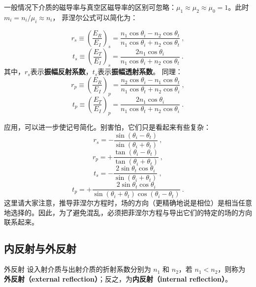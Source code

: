 一般情况下介质的磁导率与真空区磁导率的区别可忽略：$\mu_1\approx\mu_2\approx\mu_0=1$。此时$m_i=n_i/\mu_i \approx n_i$， 菲涅尔公式可以简化为：

\begin{equation}\label{eq_Fresnl_3}
r_s \equiv \left(\frac{E_R}{E_I}\right)_s = \frac{n_1\cos{\theta_i} - n_2\cos\theta_t}{n_1\cos\theta_i + n_2\cos\theta_t}~,
\end{equation}
\begin{equation}\label{eq_Fresnl_4}
t_s \equiv \left(\frac{E_T}{E_I}\right)_s =  \frac{2 n_1\cos\theta_i}{n_1\cos\theta_i + n_2\cos\theta_t}~.
\end{equation}
其中，$r_s$表示\textbf{振幅反射系数}，$t_s$表示\textbf{振幅透射系数}。
同理：
\begin{equation}\label{eq_Fresnl_5}
r_p \equiv \left(\frac{E_R}{E_I}\right)_p = \frac{n_2\cos{\theta_i} - n_1\cos\theta_t}{n_1\cos\theta_t + n_2\cos\theta_i}~,
\end{equation}
\begin{equation}\label{eq_Fresnl_6}
t_p \equiv \left(\frac{E_T}{E_I}\right)_p =  \frac{2 n_1\cos\theta_i}{n_1\cos\theta_t + n_2\cos\theta_i}~.
\end{equation}

应用，可以进一步使记号简化。别害怕，它们只是看起来有些复杂：
\begin{equation}\label{eq_Fresnl_7}
r_s = -\frac{\sin(\theta_i - \theta_t)}{\sin(\theta_i + \theta_t)}~,
\end{equation}
\begin{equation}\label{eq_Fresnl_8}
r_p = +\frac{\tan(\theta_i - \theta_t)}{\tan(\theta_i + \theta_t)}~,
\end{equation}
\begin{equation}\label{eq_Fresnl_9}
t_s = -\frac{2\sin\theta_t\cos\theta_i}{\sin(\theta_i + \theta_t)}~,
\end{equation}
\begin{equation}\label{eq_Fresnl_10}
t_p = +\frac{2\sin\theta_t\cos\theta_i}{\sin(\theta_i + \theta_t)\cos(\theta_i - \theta_t)}~.
\end{equation}
这里请大家注意，推导菲涅尔方程时，场的方向（更精确地说是相位）是相当任意地选择的。因此，为了避免混乱，必须把菲涅尔方程与导出它们的特定的场的方向联系起来。

\subsection{内反射与外反射}
\begin{definition}{外反射}
设入射介质与出射介质的折射系数分别为 $n_1$ 和 $n_2$，若 $n_1<n_2$，则称为\textbf{外反射（external reflection）}；反之，为\textbf{内反射（internal reflection）}。
\end{definition}

